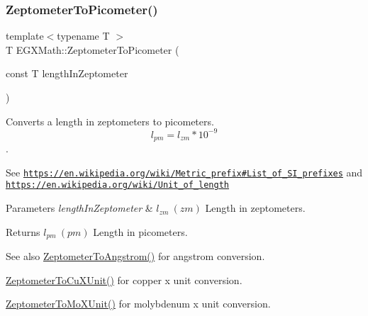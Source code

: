 \subsubsection{\texorpdfstring{Zeptometer\+To\+Picometer()}{ZeptometerToPicometer()}}
{\footnotesize\ttfamily template$<$typename T $>$ \\
T E\+G\+X\+Math\+::\+Zeptometer\+To\+Picometer (\begin{DoxyParamCaption}\item[{const T}]{length\+In\+Zeptometer }\end{DoxyParamCaption})}



Converts a length in zeptometers to picometers. \[ l_{pm}=l_{zm} * 10^{-9} \]. 

See \href{https://en.wikipedia.org/wiki/Metric_prefix#List_of_SI_prefixes}{\tt https\+://en.\+wikipedia.\+org/wiki/\+Metric\+\_\+prefix\#\+List\+\_\+of\+\_\+\+S\+I\+\_\+prefixes} and \href{https://en.wikipedia.org/wiki/Unit_of_length}{\tt https\+://en.\+wikipedia.\+org/wiki/\+Unit\+\_\+of\+\_\+length} 
\begin{DoxyParams}{Parameters}
{\em length\+In\+Zeptometer} & $ l_{zm}\ (zm)$ Length in zeptometers. \\
\hline
\end{DoxyParams}
\begin{DoxyReturn}{Returns}
$ l_{pm}\ (pm)$ Length in picometers. 
\end{DoxyReturn}
\begin{DoxySeeAlso}{See also}
\mbox{\hyperlink{group___e_g_x_math-_conversions-_length_conversions-_s_i-_zeptometer-_non-_s_i_gaa7023afd2a269dddf741cb4299803ef2}{Zeptometer\+To\+Angstrom()}} for angstrom conversion. 

\mbox{\hyperlink{group___e_g_x_math-_conversions-_length_conversions-_s_i-_zeptometer-_non-_s_i_gaeeff3d1ea7d8cd0c703419ce16fcadd7}{Zeptometer\+To\+Cu\+X\+Unit()}} for copper x unit conversion. 

\mbox{\hyperlink{group___e_g_x_math-_conversions-_length_conversions-_s_i-_zeptometer-_non-_s_i_gaa621a874847d7e6aae8d04395c68a313}{Zeptometer\+To\+Mo\+X\+Unit()}} for molybdenum x unit conversion. 
\end{DoxySeeAlso}
\mbox{\label{group___e_g_x_math-_conversions-_length_conversions-_s_i-_zeptometer-_s_i_ga442c02caa8b630c3f90675191b22bca5}} 
